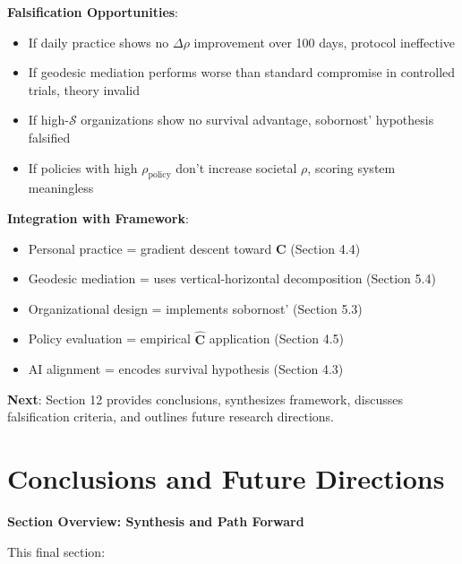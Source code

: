 \documentclass[11pt,a4paper]{article}
\theoremstyle{definition}
\theoremstyle{remark}
\begin{document}
\begin{enumerate}
\begin{mdframed}[backgroundcolor=green!10,linewidth=2pt,linecolor=green!70!black]
\textbf{Falsification Opportunities}:
\begin{itemize}[nosep]
    \item If daily practice shows no \(\Delta\rho\) improvement over 100 days, protocol ineffective
    \item If geodesic mediation performs worse than standard compromise in controlled trials, theory invalid
    \item If high-\(\mathcal{S}\) organizations show no survival advantage, sobornost' hypothesis falsified
    \item If policies with high \(\rho_{\text{policy}}\) don't increase societal \(\rho\), scoring system meaningless
\end{itemize}

\textbf{Integration with Framework}:
\begin{itemize}[nosep]
    \item Personal practice = gradient descent toward \(\mathbf{C}\) (Section 4.4)
    \item Geodesic mediation = uses vertical-horizontal decomposition (Section 5.4)
    \item Organizational design = implements sobornost' (Section 5.3)
    \item Policy evaluation = empirical \(\hat{\mathbf{C}}\) application (Section 4.5)
    \item AI alignment = encodes survival hypothesis (Section 4.3)
\end{itemize}

\textbf{Next}: Section 12 provides conclusions, synthesizes framework, discusses falsification criteria, and outlines future research directions.
\end{mdframed}


\section{Conclusions and Future Directions}

\begin{mdframed}[backgroundcolor=cyan!5,linewidth=2pt]
\textbf{Section Overview: Synthesis and Path Forward}

This final section:


\end{mdframed}
\end{enumerate}
\end{document}
